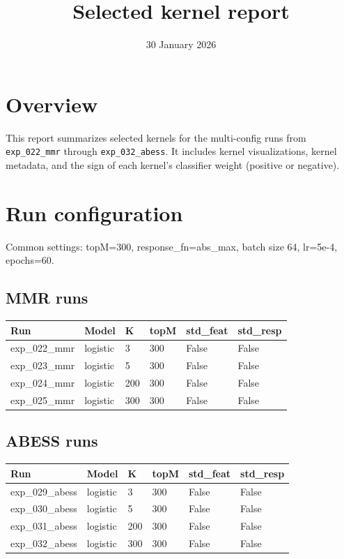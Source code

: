 \documentclass{article}
\begin{document}
\title{Selected kernel report}
\author{}
\date{30 January 2026}
\maketitle

\section*{Overview}
This report summarizes selected kernels for the multi-config runs from \texttt{exp\_022\_mmr} through \texttt{exp\_032\_abess}.
It includes kernel visualizations, kernel metadata, and the sign of each kernel's classifier weight (positive or negative).

\section*{Run configuration}
Common settings: topM=300, response\_fn=abs\_max, batch size 64, lr=5e-4, epochs=60.

\subsection*{MMR runs}

\begin{center}
\begin{tabular}{llllll}
\toprule
Run & Model & K & topM & std\_feat & std\_resp \\
\midrule
exp\_022\_mmr & logistic & 3 & 300 & False & False \\
exp\_023\_mmr & logistic & 5 & 300 & False & False \\
exp\_024\_mmr & logistic & 200 & 300 & False & False \\
exp\_025\_mmr & logistic & 300 & 300 & False & False \\
\bottomrule
\end{tabular}
\end{center}

\subsection*{ABESS runs}
\begin{center}
\begin{tabular}{llllll}
\toprule
Run & Model & K & topM & std\_feat & std\_resp \\
\midrule
exp\_029\_abess & logistic & 3 & 300 & False & False \\
exp\_030\_abess & logistic & 5 & 300 & False & False \\
exp\_031\_abess & logistic & 200 & 300 & False & False \\
exp\_032\_abess & logistic & 300 & 300 & False & False \\
\bottomrule
\end{tabular}
\end{center}
\end{document}
